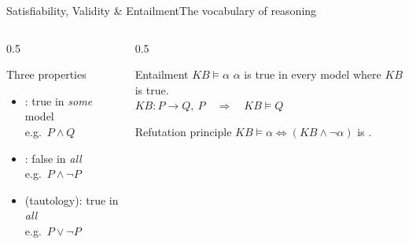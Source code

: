 \documentclass[aspectratio=169,11pt]{beamer}
\begin{document}
\begin{frame}{Satisfiability, Validity \& Entailment}{The vocabulary of reasoning}
  \begin{columns}[T]
    \begin{column}{0.5\textwidth}
      \begin{block}{Three properties}
        \small
        \begin{itemize}
          \item {}: true in \emph{some} model \\ \scriptsize e.g.\ $P \land Q$
          \item {}: false in \emph{all} \\ \scriptsize e.g.\ $P \land \neg P$
          \item {} (tautology): true in \emph{all} \\ \scriptsize e.g.\ $P \lor \neg P$
        \end{itemize}
      \end{block}
    \end{column}
    \begin{column}{0.5\textwidth}
      \begin{exampleblock}{Entailment $KB \models \alpha$}
        \small $\alpha$ is true in every model where $KB$ is true.
        \\[0.3em]
        $KB: P\rightarrow Q,\ P \quad\Rightarrow\quad KB \models Q$
      \end{exampleblock}
      \begin{alertblock}{Refutation principle}
        \small $KB \models \alpha \iff (KB \land \neg\alpha)$ is .
      \end{alertblock}
    \end{column}
  \end{columns}
\end{frame}
\end{document}
